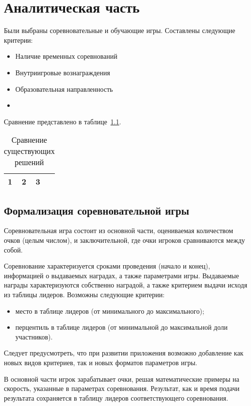 \chapter{Аналитическая часть}
Были выбраны соревновательные и обучающие игры. Составлены следующие критерии:
\begin{itemize}
	\item Наличие временных соревнований
	\item Внутриигровые вознаграждения
	\item Образовательная направленность
	\item 
\end{itemize}
Сравнение представлено в таблице~\ref{tbl:comparison}.

\begin{table}[]
	\caption{\label{tbl:comparison}Сравнение существующих решений}
	\begin{tabular}{|l|l|l|l|}
		\hline
		1 & 2 & 3 &\\\hline
	\end{tabular}
\end{table}

\section{Формализация соревновательной игры}

Соревновательная игра состоит из основной части, оцениваемая количеством очков (целым числом), и заключительной, где очки игроков сравниваются между собой.

Соревнование характеризуется сроками проведения (начало и конец), информацией о выдаваемых наградах, а также параметрами игры. Выдаваемые награды характеризуются собственно наградой, а также критерием выдачи исходя из таблицы лидеров. Возможны следующие критерии:
\begin{itemize}
	\item место в таблице лидеров (от минимального до максимального);
	\item перцентиль в таблице лидеров (от минимальной до максимальной доли участников).
\end{itemize}
Следует предусмотреть, что при развитии приложения возможно добавление как новых видов критериев, так и новых форматов параметров игры. 


В основной части игрок зарабатывает очки, решая математические примеры на скорость, указанные в параметрах соревнования. Результат, как и время подачи результата сохраняется в таблицу лидеров соответствующего соревнования.

